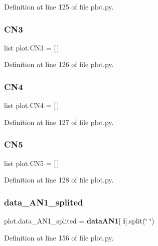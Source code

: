 Definition at line 125 of file plot.\+py.

\mbox{\label{namespaceplot_acdfec7224065e60515399f9721232bde}} 
\subsubsection{C\+N3}
{\footnotesize\ttfamily list plot.\+C\+N3 = [$\,$]}



Definition at line 126 of file plot.\+py.

\mbox{\label{namespaceplot_aa8b170fed1b9c13e6a0d2e9a2fc19c3d}} 
\subsubsection{C\+N4}
{\footnotesize\ttfamily list plot.\+C\+N4 = [$\,$]}



Definition at line 127 of file plot.\+py.

\mbox{\label{namespaceplot_a1581c91dbcc967fdaf3d219101bd9fe1}} 
\subsubsection{C\+N5}
{\footnotesize\ttfamily list plot.\+C\+N5 = [$\,$]}



Definition at line 128 of file plot.\+py.

\mbox{\label{namespaceplot_a51cb5772e569630206831ec00e5b1d09}} 
\subsubsection{data\+\_\+\+A\+N1\+\_\+splited}
{\footnotesize\ttfamily plot.\+data\+\_\+\+A\+N1\+\_\+splited = \textbf{ data\+A\+N1}[\textbf{ i}].split(\char`\"{} \char`\"{})}



Definition at line 156 of file plot.\+py.

\mbox{\label{namespaceplot_ae35d959923eb6b3a10f21a4a3d2b68c0}} 
